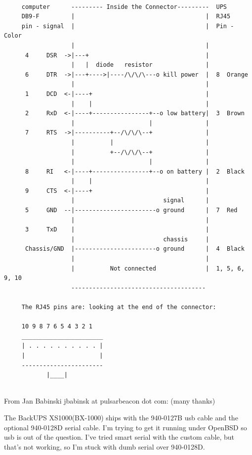 \footnotesize
\begin{verbatim}
     
     computer      --------- Inside the Connector---------  UPS
     DB9-F         |                                     |  RJ45
     pin - signal  |                                     |  Pin - Color
                   |                                     |
      4     DSR  ->|---+                                 |
                   |   |  diode   resistor               |
      6     DTR  ->|---+---->|----/\/\/\---o kill power  |  8  Orange
                   |                                     |
      1     DCD  <-|----+                                |
                   |    |                                |
      2     RxD  <-|----+----------------+--o low battery|  3  Brown
                   |                     |               |
      7     RTS  ->|----------+--/\/\/\--+               |
                   |          |                          |
                   |          +--/\/\/\--+               |
                   |                     |               |
      8     RI   <-|----+----------------+--o on battery |  2  Black
                   |    |                                |
      9     CTS  <-|----+                                |
                   |                         signal      |
      5     GND  --|-----------------------o ground      |  7  Red
                   |                                     |
      3     TxD    |                                     |
                   |                         chassis     |
      Chassis/GND  |-----------------------o ground      |  4  Black
                   |                                     |
                   |          Not connected              |  1, 5, 6, 9, 10
                   --------------------------------------
     
     The RJ45 pins are: looking at the end of the connector:
     
     10 9 8 7 6 5 4 3 2 1
     _______________________
     | . . . . . . . . . . |
     |                     |
     -----------------------
            |____|
     
\end{verbatim}
\normalsize

From Jan Babinski jbabinsk at pulsarbeacon dot com: (many thanks)  

The BackUPS XS1000(BX-1000) ships with the 940-0127B usb cable and the
optional 940-0128D serial cable. I'm trying to get it running under OpenBSD so
usb is out of the question. I've tried smart serial with the custom cable, but
that's not working, so I'm stuck with dumb serial over 940-0128D.  

